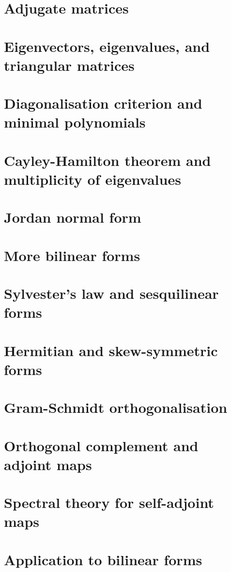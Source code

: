 \documentclass{article}
\begin{document}
\section{Adjugate matrices}

\section{Eigenvectors, eigenvalues, and triangular matrices}

\section{Diagonalisation criterion and minimal polynomials}

\section{Cayley-Hamilton theorem and multiplicity of eigenvalues}

\section{Jordan normal form}

\section{More bilinear forms}

\section{Sylvester's law and sesquilinear forms}

\section{Hermitian and skew-symmetric forms}

\section{Gram-Schmidt orthogonalisation}

\section{Orthogonal complement and adjoint maps}

\section{Spectral theory for self-adjoint maps}

\section{Application to bilinear forms}

\end{document}
